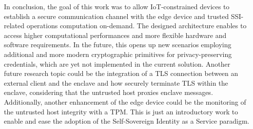 
In conclusion, the goal of this work was to allow IoT-constrained devices to establish a secure communication channel with the edge device and trusted SSI-related operations computation on-demand. The designed architecture enables to access higher computational performances and more flexible hardware and software requirements. In the future, this opens up new scenarios employing additional and more modern cryptographic primitives for privacy-preserving credentials, which are yet not implemented in the current solution. 
Another future research topic could be the integration of a TLS connection between an external client and the enclave and how securely terminate TLS within the enclave, considering that the untrusted host proxies enclave messages. 
Additionally, another enhancement of the edge device could be the monitoring of the untrusted host integrity with a TPM.
This is just an introductory work to enable and ease the adoption of the Self-Sovereign Identity as a Service paradigm.